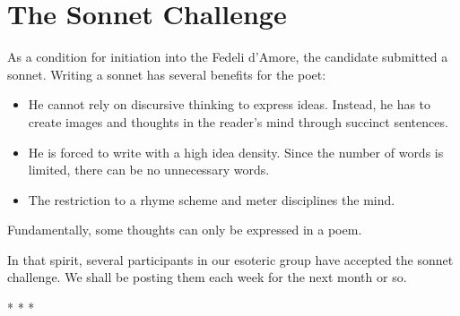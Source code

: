 \section{The Sonnet Challenge}

As a condition for initiation into the Fedeli d'Amore, the candidate submitted a sonnet. Writing a sonnet has several benefits for the poet:

\begin{itemize}


\item He cannot rely on discursive thinking to express ideas. Instead, he has to create images and thoughts in the reader's mind through succinct sentences.

\item He is forced to write with a high idea density. Since the number of words is limited, there can be no unnecessary words.

\item The restriction to a rhyme scheme and meter disciplines the mind.
\end{itemize}


Fundamentally, some thoughts can only be expressed in a poem.

In that spirit, several participants in our esoteric group have accepted the sonnet challenge. We shall be posting them each week for the next month or so.



\begin{center}* * *\end{center}

